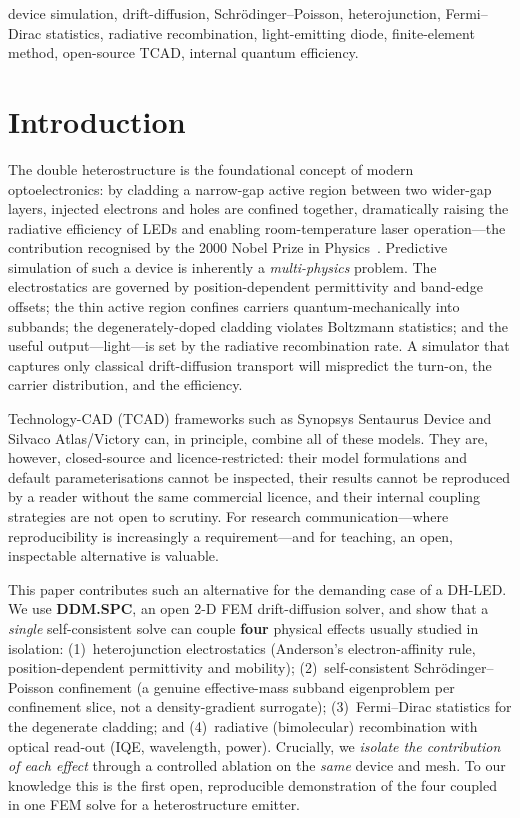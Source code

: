 \documentclass[conference]{IEEEtran}
\begin{document}
\begin{IEEEkeywords}
device simulation, drift-diffusion, Schr\"odinger--Poisson, heterojunction,
Fermi--Dirac statistics, radiative recombination, light-emitting diode,
finite-element method, open-source TCAD, internal quantum efficiency.
\end{IEEEkeywords}

\section{Introduction}
The double heterostructure is the foundational concept of modern optoelectronics:
by cladding a narrow-gap active region between two wider-gap layers, injected
electrons and holes are confined together, dramatically raising the radiative
efficiency of LEDs and enabling room-temperature laser operation---the
contribution recognised by the 2000 Nobel Prize in Physics~\cite{alferov}.
Predictive simulation of such a device is inherently a \emph{multi-physics}
problem. The electrostatics are governed by position-dependent permittivity and
band-edge offsets; the thin active region confines carriers quantum-mechanically
into subbands; the degenerately-doped cladding violates Boltzmann statistics; and
the useful output---light---is set by the radiative recombination rate. A
simulator that captures only classical drift-diffusion transport will mispredict
the turn-on, the carrier distribution, and the efficiency.

Technology-CAD (TCAD) frameworks such as Synopsys Sentaurus Device and Silvaco
Atlas/Victory can, in principle, combine all of these models. They are, however,
closed-source and licence-restricted: their model formulations and default
parameterisations cannot be inspected, their results cannot be reproduced by a
reader without the same commercial licence, and their internal coupling
strategies are not open to scrutiny. For research communication---where
reproducibility is increasingly a requirement---and for teaching, an open,
inspectable alternative is valuable.

This paper contributes such an alternative for the demanding case of a DH-LED. We
use \textbf{DDM.SPC}, an open 2-D FEM drift-diffusion solver, and show that a
\emph{single} self-consistent solve can couple \textbf{four} physical effects
usually studied in isolation: (1)~heterojunction electrostatics (Anderson's
electron-affinity rule, position-dependent permittivity and mobility);
(2)~self-consistent Schr\"odinger--Poisson confinement (a genuine effective-mass
subband eigenproblem per confinement slice, not a density-gradient surrogate);
(3)~Fermi--Dirac statistics for the degenerate cladding; and (4)~radiative
(bimolecular) recombination with optical read-out (IQE, wavelength, power).
Crucially, we \emph{isolate the contribution of each effect} through a controlled
ablation on the \emph{same} device and mesh. To our knowledge this is the first
open, reproducible demonstration of the four coupled in one FEM solve for a
heterostructure emitter.
\end{document}
